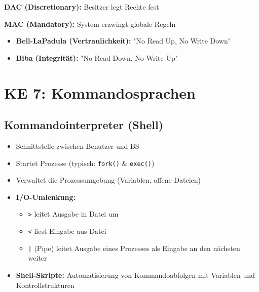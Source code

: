 \documentclass[9pt,a4paper]{extarticle}
\begin{document}
\begin{multicols*}{2}
\textbf{DAC (Discretionary):} Besitzer legt Rechte fest

\textbf{MAC (Mandatory):} System erzwingt globale Regeln
\begin{itemize}
\item \textbf{Bell-LaPadula (Vertraulichkeit):} "No Read Up, No Write Down"
\item \textbf{Biba (Integrität):} "No Read Down, No Write Up"
\end{itemize}

\section{KE 7: Kommandosprachen}

\subsection{Kommandointerpreter (Shell)}
\begin{itemize}
\item Schnittstelle zwischen Benutzer und BS
\item Startet Prozesse (typisch: \texttt{fork()} \& \texttt{exec()})
\item Verwaltet die Prozessumgebung (Variablen, offene Dateien)
\item \textbf{I/O-Umlenkung:}
  \begin{itemize}
  \item \texttt{>} leitet Ausgabe in Datei um
  \item \texttt{<} liest Eingabe aus Datei
  \item \texttt{|} (Pipe) leitet Ausgabe eines Prozesses als Eingabe an den nächsten weiter
  \end{itemize}
\item \textbf{Shell-Skripte:} Automatisierung von Kommandoabfolgen mit Variablen und Kontrollstrukturen
\end{itemize}

\end{multicols*}
\end{document}
